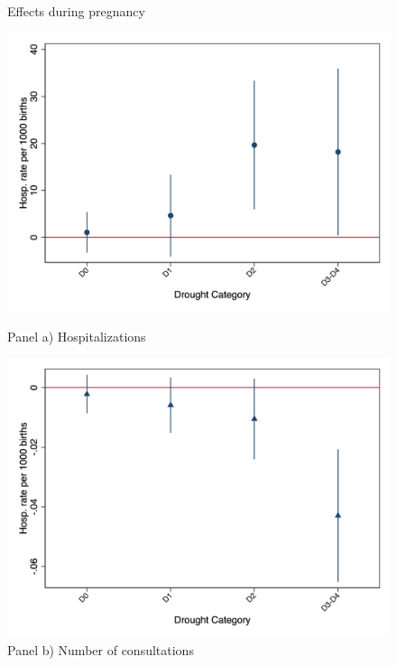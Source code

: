 \documentclass[12pt, oneside]{article}      %
\begin{document}
\begin{figure}[!ht]
    \centering
    \caption{Effects during pregnancy}
    \begin{minipage}[b]{0.6\textwidth}
        \centering
        \includegraphics[width=\linewidth]{figures_2410/02_maternal_muni_by_Dcategory.png} %
     \caption*{Panel a) Hospitalizations}
    \end{minipage}
    \begin{minipage}[b]{0.6\textwidth}
        \centering
        \includegraphics[width=\linewidth]{figures_2410/02_total_consult_muni_by_Dcategory.png} %
 \caption*{Panel b) Number of consultations }
    \end{minipage}
    \label{fig:effects_pregnancy_drought}

\end{figure}
\end{document}
